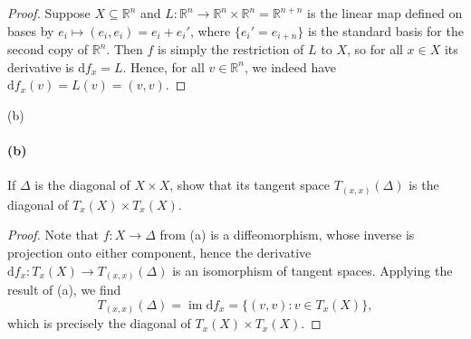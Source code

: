 \documentclass[12pt]{article}
\newlength{\myparskip}
\newenvironment{fullbox}{\begin{lrbox}{\savefullbox}\begin{minipage}{\dimexpr\textwidth-2\fboxsep\relax}\setlength{\parskip}{\myparskip}}{\end{minipage}\end{lrbox}\framebox[\textwidth]{\usebox{\savefullbox}}}
\newenvironment{pbox}[1][]{\begin{fullbox}\ifx#1\empty\else\paragraph{#1}\phantom{}\fi}{\end{fullbox}}
\theoremstyle{definition}
\newcommand{\R}{\mathbb{R}}
\newcommand{\<}{\langle}
\renewcommand{\>}{\rangle}
\newcommand{\seq}{\subseteq}
\DeclareMathOperator{\im}{im}
\newcommand{\dd}{\mathrm{d}}
\begin{document}
\begin{proof}
    Suppose $X \seq \R^n$ and $L : \R^n \to \R^n \times \R^n = \R^{n + n}$ is the linear map defined on bases by $e_i \mapsto (e_i, e_i) = e_i + e_i'$, where $\{e_i' = e_{i+n}\}$ is the standard basis for the second copy of $\R^n$.
    Then $f$ is simply the restriction of $L$ to $X$, so for all $x \in X$ its derivative is $\dd{f}_x = L$.
    Hence, for all $v \in \R^n$, we indeed have $\dd{f}_x(v) = L(v) = (v, v)$.
\end{proof}

\begin{pbox}[(b)]
    If $\Delta$ is the diagonal of $X \times X$, show that its tangent space $T_{(x, x)}(\Delta)$ is the diagonal of $T_x(X) \times T_x(X)$.
\end{pbox}

\begin{proof}
    Note that $f : X \to \Delta$ from (a) is a diffeomorphism, whose inverse is projection onto either component, hence the derivative $\dd{f}_x : T_x(X) \to T_{(x, x)}(\Delta)$ is an isomorphism of tangent spaces.
    Applying the result of (a), we find
    \[
        T_{(x, x)}(\Delta)
            = \im \dd{f}_x
            = \{(v, v) : v \in T_x(X)\},
    \]
    which is precisely the diagonal of $T_x(X) \times T_x(X)$.
\end{proof}
\end{document}
